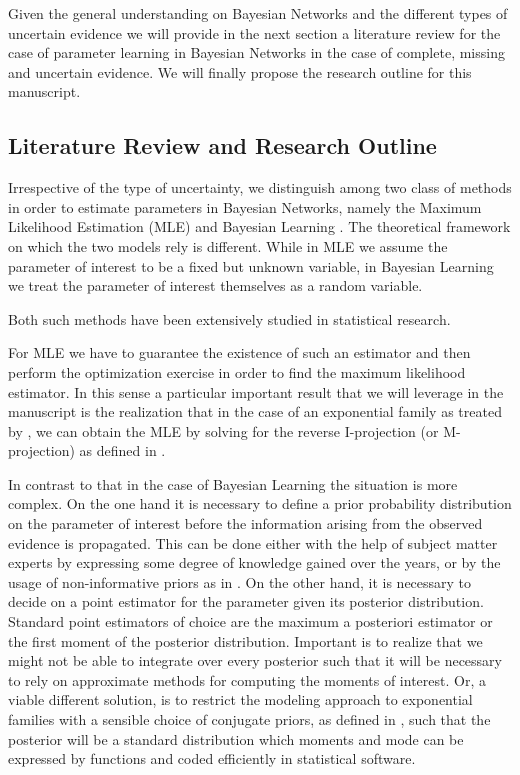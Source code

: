 \documentclass[11pt]{article}
\begin{document}
\begin{article}
Given the general understanding on Bayesian Networks and the
different types of uncertain evidence we will provide in the next
section a literature review for the case of parameter learning in
Bayesian Networks in the case of complete, missing and uncertain
evidence. We will finally propose the research outline for this
manuscript. 

\subsection{Literature Review and Research Outline}
\label{literature_review}
Irrespective of the type of uncertainty, we distinguish among two
class of methods in order to estimate parameters in Bayesian
Networks, namely the Maximum Likelihood Estimation (MLE)
\cite{spiegelhalter1990sequential} and Bayesian Learning
\cite{Smith_2001}. The theoretical framework on which the two models
rely is different. While in MLE we assume the parameter of
interest to be a fixed but unknown variable, in Bayesian Learning
we treat the parameter of interest themselves as a random
variable.

Both such methods have been extensively studied in statistical
research.

For MLE we have to guarantee the existence of such an estimator and
then perform the optimization exercise in order to find the maximum
likelihood estimator. In this sense a particular important result
that we will leverage in the manuscript is the realization that in
the case of an exponential family as treated by
\cite{barndorff1978hyperbolic}, we can obtain the MLE by solving for
the reverse I-projection (or M-projection) as defined in
\cite{csiszar1975divergence}.

In contrast to that in the case of Bayesian Learning the situation
is more complex. On the one hand it is necessary to define a prior
probability distribution on the parameter of interest before the
information arising from the observed evidence is propagated. This
can be done either with the help of subject matter experts by
expressing some degree of knowledge gained over the years, or by
the usage of non-informative priors as in
\cite{syversveen1998noninformative}. On the other hand, it is
necessary to decide on a point estimator for the parameter given
its posterior distribution. Standard point estimators of choice are
the maximum a posteriori estimator or the first moment of the
posterior distribution. Important is to realize that we might not
be able to integrate over every posterior such that it will be
necessary to rely on approximate methods for computing the moments
of interest. Or, a viable different solution, is to restrict the
modeling approach to exponential families with a sensible choice of
conjugate priors, as defined in \cite{schlaifer1961applied}, such
that the posterior will be a standard distribution which moments
and mode can be expressed by functions and coded efficiently in
statistical software.


\end{article}
\end{document}
